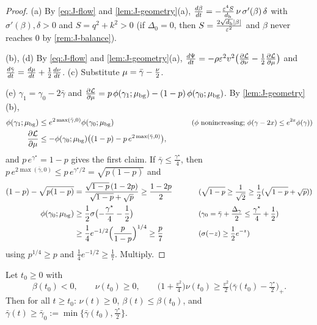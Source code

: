 \begin{proof}
(a) By \cref{eq:J-flow} and \cref{lem:J-geometry}(a), $\ddt{\beta}=-\frac{\initscale^4S}{d_{\mathrm h}}\,\nu\,\sigma'(\beta)\,\delta$ with $\sigma'(\beta),\delta>0$ and $S=q^2+k^2>0$ (if $\Delta_0=0$, then $S=\frac{2\sqrt{d_{\mathrm h}}|\beta|}{\varepsilon^2}$ and $\beta$ never reaches $0$ by \cref{rem:J-balance}).

(b), (d) By \cref{eq:J-flow} and \cref{lem:J-geometry}(a), $\ddt{\Psi}=-\rho\initscale^2v^2\bigl(\pd{\mathcal L}{\nu}-\frac{1}{2}\pd{\mathcal L}{\cnt}\bigr)$ and
$\ddt{\bar\gamma}=\ddt{\cnt}+\frac{1}{2}\ddt{\nu}$. (c) Substitute $\mu=\bar\gamma-\frac{\nu}{2}$.

(e) $\gamma_1=\gamma_0-2\bar\gamma$ and $\pd{\mathcal L}{\cnt}=p\,\phi(\gamma_1;\cbg)-(1-p)\,\phi(\gamma_0;\cbg)$. By \cref{lem:J-geometry}(b),
\begin{alignat*}{2}
 \phi(\gamma_1;\cbg)&\le e^{2\max(\bar\gamma,0)}\phi(\gamma_0;\cbg) &\qquad& \why{$\phi$ nonincreasing; $\phi(\gamma-2x)\le e^{2x}\phi(\gamma)$}\\
 \pd{\mathcal L}{\cnt}&\le-\phi(\gamma_0;\cbg)\bigl((1-p)-p\,e^{2\max(\bar\gamma,0)}\bigr),
\end{alignat*}
and $p\,e^{\gamma^\star}=1-p$ gives the first claim. If $\bar\gamma\le\frac{\gamma^\star}{4}$, then $p\,e^{2\max(\bar\gamma,0)}\le p\,e^{\gamma^\star/2}=\sqrt{p(1-p)}$ and
\begin{alignat*}{2}
 (1-p)-\sqrt{p(1-p)}&=\frac{\sqrt{1-p}\,(1-2p)}{\sqrt{1-p}+\sqrt p}\ge\frac{1-2p}{2} &\qquad& \why{$\sqrt{1-p}\ge\tfrac{1}{\sqrt2}\ge\tfrac{1}{2}(\sqrt{1-p}+\sqrt p)$}\\
 \phi(\gamma_0;\cbg)&\ge\tfrac{1}{2}\sigma\bigl(-\tfrac{\gamma^\star}{4}-\tfrac{1}{2}\bigr) && \why{$\gamma_0=\bar\gamma+\tfrac{\Delta_\gamma}{2}\le\tfrac{\gamma^\star}{4}+\tfrac{1}{2}$}\\
 &\ge\tfrac{1}{4}e^{-1/2}\Bigl(\frac{p}{1-p}\Bigr)^{1/4}\ge\frac{p}{7} && \why{$\sigma(-z)\ge\tfrac{1}{2}e^{-z}$}
\end{alignat*}
using $p^{1/4}\ge p$ and $\frac{1}{4}e^{-1/2}\ge\frac{1}{7}$. Multiply.
\end{proof}

\begin{lemma}
\label{lem:J-align}
Let $t_0\ge0$ with
\[
 \beta(t_0)<0,\qquad \nu(t_0)\ge0,\qquad \bigl(1+\tfrac{v^2}{4}\bigr)\nu(t_0)\ge\tfrac{v^2}{2}\bigl(\bar\gamma(t_0)-\tfrac{\gamma^\star}{2}\bigr)_+ .
\]
Then for all $t\ge t_0$: $\nu(t)\ge0$, $\beta(t)\le \beta(t_0)$, and $\bar\gamma(t)\ge \bar\gamma_0:=\min\{\bar\gamma(t_0),\frac{\gamma^\star}{2}\}$.
\end{lemma}

